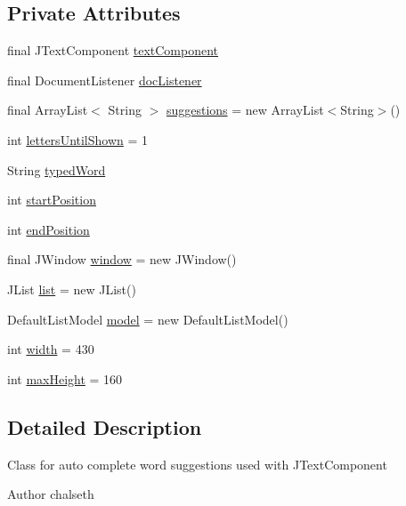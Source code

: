 \subsection*{Private Attributes}
\begin{DoxyCompactItemize}
\item 
final J\+Text\+Component \hyperlink{classqlib_1_1ide_1_1AutoComplete_ab41cb720a8247194d0c4c2cc5fa6aeef}{text\+Component}
\item 
final Document\+Listener \hyperlink{classqlib_1_1ide_1_1AutoComplete_a79190bf245b656b279233a982ed4248c}{doc\+Listener}
\item 
final Array\+List$<$ String $>$ \hyperlink{classqlib_1_1ide_1_1AutoComplete_a547307db6247e63b17bad503504dbd22}{suggestions} = new Array\+List$<$String$>$()
\item 
int \hyperlink{classqlib_1_1ide_1_1AutoComplete_ab4de0d96f7b92c3768e1c08fbb47aed5}{letters\+Until\+Shown} = 1
\item 
String \hyperlink{classqlib_1_1ide_1_1AutoComplete_add24423a55cac629e8316c5918a6d954}{typed\+Word}
\item 
int \hyperlink{classqlib_1_1ide_1_1AutoComplete_a7a588e36bc43ffbb782e6f43d89176a2}{start\+Position}
\item 
int \hyperlink{classqlib_1_1ide_1_1AutoComplete_ab737bdeda6e26125bc85ad00f5de14d2}{end\+Position}
\item 
final J\+Window \hyperlink{classqlib_1_1ide_1_1AutoComplete_a858e66824f2ef4066d9987b4206037a2}{window} = new J\+Window()
\item 
J\+List \hyperlink{classqlib_1_1ide_1_1AutoComplete_ab04a22ed940369f199952db2ce1c04f8}{list} = new J\+List()
\item 
Default\+List\+Model \hyperlink{classqlib_1_1ide_1_1AutoComplete_aaaa89916b82f63bd8d7079c84c251e27}{model} = new Default\+List\+Model()
\item 
int \hyperlink{classqlib_1_1ide_1_1AutoComplete_a312cdabc82431a5cc8d73c1884c416a7}{width} = 430
\item 
int \hyperlink{classqlib_1_1ide_1_1AutoComplete_a8ebc95801d3b19aff09123cf8729e2c9}{max\+Height} = 160
\end{DoxyCompactItemize}


\subsection{Detailed Description}
Class for auto complete word suggestions used with J\+Text\+Component \begin{DoxyAuthor}{Author}
chalseth 
\end{DoxyAuthor}


